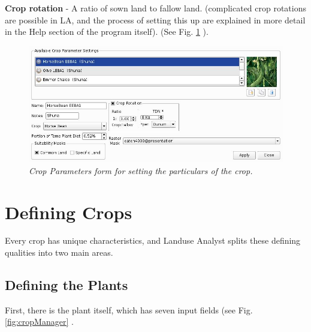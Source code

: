   \textbf{Crop rotation} - A ratio of sown land to fallow land. (complicated crop
  rotations are possible in LA, and the process of setting this up are
  explained in more detail in the Help section of the program itself). (See Fig. \ref{fig:cropParameters} ).
    \begin{figure}[htbp] %
        \includegraphics[scale=.28]{./images/cropParameters.jpg}
      \caption[Crop Parameters]{\label{fig:cropParameters}\textit{Crop
Parameters form for setting the particulars of the crop.}}
    \end{figure}

\section{Defining Crops}Every crop has unique
characteristics, and Landuse Analyst splits these defining qualities into two
main areas.
  \subsection{Defining the Plants}First, there is
the plant itself, which has seven input fields (see Fig. \ref{fig:cropManager} .

